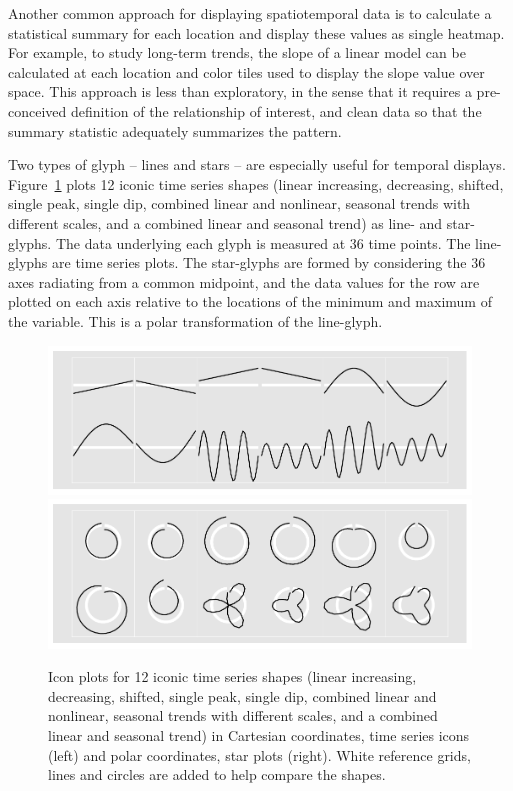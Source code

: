 \documentclass[oneside]{article}
\begin{document}
Another common approach for displaying spatiotemporal data is to calculate a statistical summary for each location and display these values as single heatmap. For example, to study long-term trends, the slope of a linear model can be calculated at each location and color tiles used to display the slope value over space. This approach is less than exploratory, in the sense that it requires a pre-conceived definition of the relationship of interest, and clean data so that the summary statistic adequately summarizes the pattern. 

Two types of glyph -- lines and stars -- are especially useful for temporal displays. Figure~\ref{fig:templates} plots 12 iconic time series shapes (linear increasing, decreasing, shifted, single peak, single dip, combined linear and nonlinear, seasonal trends with different scales, and a combined linear and seasonal trend) as line- and star-glyphs. The data underlying each glyph is measured at 36 time points. The line-glyphs are   time series plots. The star-glyphs are formed by considering the 36 axes radiating from a common midpoint, and the data values for the row are plotted on each axis relative to the locations of the minimum and maximum of the variable. This is a polar transformation of the line-glyph.

\begin{figure}[htbp]
  \centering
  \includegraphics[width=0.5\linewidth]{euclid-to-polar-1}%
  \includegraphics[width=0.5\linewidth]{euclid-to-polar-2}

  \caption{Icon plots for 12 iconic time series shapes (linear increasing, decreasing, shifted, single peak, single dip, combined linear and nonlinear, seasonal trends with different scales, and a combined linear and seasonal trend) in Cartesian coordinates, time series icons (left) and polar coordinates, star plots (right). White reference grids, lines and circles are added to help compare the shapes.}
  \label{fig:templates}
\end{figure}
\end{document}
